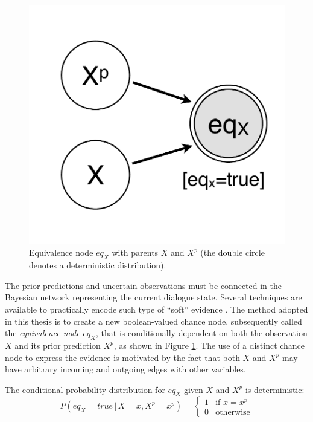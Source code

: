 \begin{figure}
\vspace{-5mm}
\centering
\includegraphics[scale=0.25]{imgs/prediction.pdf} 
\vspace{-2mm}
\caption{Equivalence node $\mathit{eq}_{X}$ with parents $X$ and $X^p$ (the double circle denotes a deterministic distribution).}
\label{fig:prediction}
\end{figure}

The prior predictions and uncertain observations must be connected in the Bayesian network representing the current dialogue state. Several techniques are available to practically encode such type of ``soft'' evidence \citep{Pan06beliefupdate}.   The method adopted in this thesis is to create a new boolean-valued chance node, subsequently called the \textit{equivalence node} $\mathit{eq}_{X}$, that is conditionally dependent on both the observation $X$ and its prior prediction $X^p$, as shown in Figure \ref{fig:prediction}. The use of a distinct chance node to express the evidence is motivated by the fact that both $X$ and $X^p$ may have arbitrary incoming and outgoing edges with other variables. 

The conditional probability distribution for $\mathit{eq}_X$ given $X$ and $X^p$ is deterministic:
\begin{equation}
P(\mathit{eq}_{X}\!=\!true \, | \, X\!=\!x, X^p\!=\!x^p) = \begin{cases}
1 & \text{if } x = x^p \\
0 & \text{otherwise}
\end{cases} \label{eq:equivdistrib}
\end{equation}


